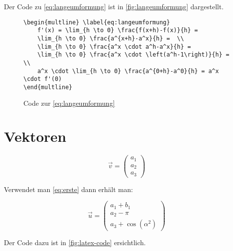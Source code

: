 Der Code zu \autoref{eq:langeumformung} ist in \autoref{fig:langeumformung}
dargestellt.
\begin{figure}[ht]
\centering
\begin{minipage}{0.8\textwidth}
\begin{verbatim}
\begin{multline} \label{eq:langeumformung}
    f'(x) = \lim_{h \to 0} \frac{f(x+h)-f(x)}{h} = 
    \lim_{h \to 0} \frac{a^{x+h}-a^x}{h} =  \\
    \lim_{h \to 0} \frac{a^x \cdot a^h-a^x}{h} = 
    \lim_{h \to 0} \frac{a^x \cdot \left(a^h-1\right)}{h} =  \\
    a^x \cdot \lim_{h \to 0} \frac{a^{0+h}-a^0}{h} = a^x \cdot f'(0)
\end{multline}
\end{verbatim}
\end{minipage}
	\caption{Code zur \autoref{eq:langeumformung}}
\label{fig:langeumformung}
\end{figure}


\section{Vektoren}

\begin{equation}\label{eq:erste}
\vec v = \begin{pmatrix}
a_1\\
a_2\\
a_3
\end{pmatrix}
\end{equation}

Verwendet man \autoref{eq:erste} dann erhält man:

\begin{equation}\label{eq:zweite}
\vec u = \begin{pmatrix}
a_1+b_1\\
a_2-\pi\\
a_3+\cos\left(\alpha^2\right)
\end{pmatrix}
\end{equation}

Der Code dazu ist in \autoref{fig:latex-code} ersichtlich.

